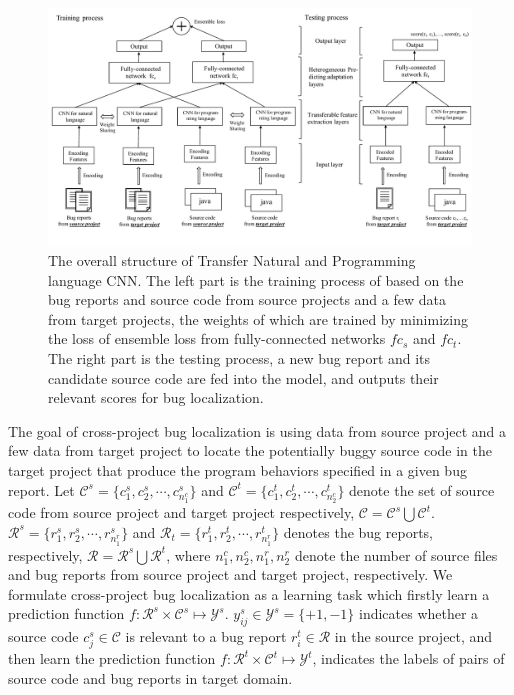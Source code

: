 \begin{figure}[hbt]
\centering
\includegraphics[width = 2\columnwidth]{pic/structure.pdf}
\caption{The overall structure of Transfer Natural and Programming language CNN.  The left part is the training process of \TRANPCNN based on the bug reports and source code from source projects and a few data from target projects, the weights of which are trained by minimizing the loss of ensemble loss from fully-connected networks $fc_s$ and $fc_t$. The right part is the testing process, a new bug report and its candidate source code are fed into the model, and \TRANPCNN outputs their relevant scores for bug localization.}
\label{fig:structure}
\end{figure}


The goal of cross-project bug localization is using data from source project and a few data from target project to locate the potentially buggy source code in the target project that produce the program behaviors specified in a given bug report.  Let $\mathcal{C}^s =   \{ { c^s_1, c^s_2}, \cdots, c^s_{n^c_1} \} $ and $\mathcal{C}^t =\{ c^t_1, c^t_2, \cdots, c^t_{n^c_2} \}$ denote the set of source code from source project and target project respectively, $\mathcal{C}=\mathcal{C}^s \bigcup \mathcal{C}^t $. 
$\mathcal{R}^s =\{ r^s_1, r^s_2, \cdots, r^s_{n^r_1} \}$ and $\mathcal{R}_t =\{ r^t_1, r^t_2, \cdots, r^t_{n^r_1} \}$ denotes the bug reports, respectively, $\mathcal{R}=\mathcal{R}^s \bigcup \mathcal{R}^t $, where $n^c_1, n^c_2, n^r_1, n^r_2$ denote the number of source files and bug reports from source project and target project, respectively. We formulate cross-project bug localization as a learning task which firstly learn a prediction function $f: \mathcal{R}^s \times \mathcal{C}^s \mapsto \mathcal{Y}^s$. $y^s_{ij} \in \mathcal{Y}^s = \{ +1, -1 \}$ indicates whether a source code $c^s_j \in \mathcal{C} $ is relevant to a bug report $r^t_i \in \mathcal{R}$ in the source project, and then learn the prediction function $f: \mathcal{R}^t \times \mathcal{C}^t \mapsto \mathcal{Y}^t$, indicates the labels of pairs of source code and bug reports in target domain. 

